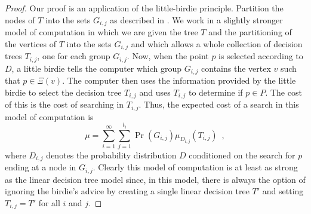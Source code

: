 \documentclass[charterfonts,lotsofwhite]{patmorin}
\begin{document}
\begin{proof}
Our proof is an application of the little-birdie principle.  Partition
the nodes of $T$ into the sets $G_{i,j}$ as described in
.  We work in a slightly stronger model of
computation in which we are given the tree $T$ and the partitioning of
the vertices of $T$ into the sets $G_{i,j}$ and which allows a whole
collection of decision trees $T_{i,j}$, one for each group $G_{i,j}$.
Now, when the point $p$ is selected according to $D$, a little birdie
tells the computer which group $G_{i,j}$ contains the vertex $v$ such
that $p\in\Xi(v)$.  The computer then uses the information
provided by the little birdie to select the decision tree $T_{i,j}$
and uses $T_{i,j}$ to determine if $p\in P$.  The cost of this is the
cost of searching in $T_{i,j}$.  Thus, the expected cost of a search
in this model of computation is
\[
     \mu = \sum_{i=1}^\infty \sum_{j=1}^{t_i}
	\Pr(G_{i,j})\mu_{D_{i,j}}(T_{i,j}) \enspace ,
\]
where $D_{i,j}$ denotes the probability distribution $D$ conditioned
on the search for $p$ ending at a node in $G_{i,j}$.  Clearly this
model of computation is at least as strong as the linear decision tree
model since, in this model, there is always the option of ignoring the
birdie's advice by creating a single linear decision tree $T'$ and
setting $T_{i,j}=T'$ for all $i$ and $j$.


\end{proof}
\end{document}
